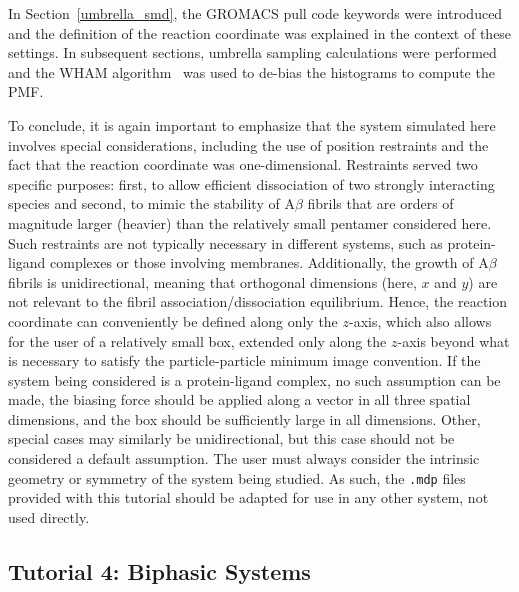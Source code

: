 \documentclass[9pt,tutorial,pubversion]{livecoms}
\begin{document}
In Section~\ref{umbrella_smd}, the GROMACS pull code keywords were introduced and the definition of the reaction coordinate was explained in the context of these settings. In subsequent sections, umbrella sampling calculations were performed and the WHAM algorithm~\cite{Kumar1992} was used to de-bias the histograms to compute the PMF.

To conclude, it is again important to emphasize that the system simulated here involves special considerations, including the use of position restraints and the fact that the reaction coordinate was one-dimensional. Restraints served two specific purposes: first, to allow efficient dissociation of two strongly interacting species and second, to mimic the stability of A$\beta$ fibrils that are orders of magnitude larger (heavier) than the relatively small pentamer considered here. Such restraints are not typically necessary in different systems, such as protein-ligand complexes or those involving membranes. Additionally, the growth of A$\beta$ fibrils is unidirectional, meaning that orthogonal dimensions (here, $x$ and $y$) are not relevant to the fibril association/dissociation equilibrium. Hence, the reaction coordinate can conveniently be defined along only the $z$-axis, which also allows for the user of a relatively small box, extended only along the $z$-axis beyond what is necessary to satisfy the particle-particle minimum image convention. If the system being considered is a protein-ligand complex, no such assumption can be made, the biasing force should be applied along a vector in all three spatial dimensions, and the box should be sufficiently large in all dimensions. Other, special cases may similarly be unidirectional, but this case should not be considered a default assumption. The user must always consider the intrinsic geometry or symmetry of the system being studied. As such, the \texttt{.mdp} files provided with this tutorial should be adapted for use in any other system, not used directly.



\subsection{Tutorial 4: Biphasic Systems} \label{biphasic}
\end{document}
